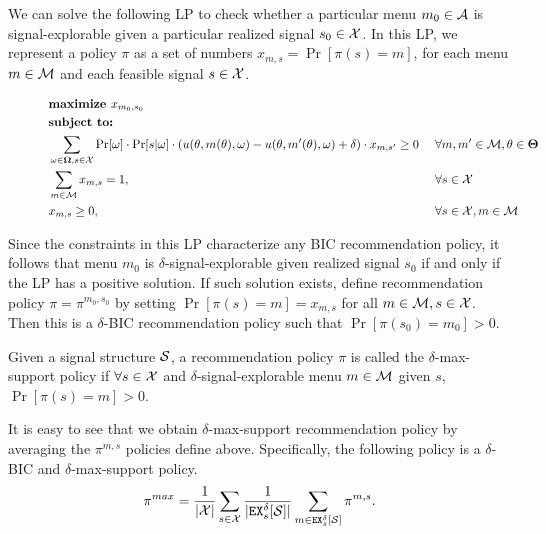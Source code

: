We can solve the following LP to check whether a particular menu $m_0 \in\A$ is signal-explorable given a particular realized signal $s_0\in\X$. In this LP, we represent a policy $\pi$ as a set of numbers
    $x_{m,s} = \Pr[\pi(s)=m]$,
for each menu $m\in \M$ and each feasible signal $s\in \X$. 

\begin{figure}[H]
\begin{mdframed}
\begin{alignat*}{2}
 & \textbf{maximize }    x_{m_0,s_0}\  \\
&  \textbf{subject to: }\\
 & \sum_{\omega \in \varOmega, s \in \X} \Pr[\omega] \cdot \Pr[s | \omega] \cdot \left(u(\theta, m(\theta), \omega) - u(\theta, m'(\theta), \omega) + \delta\right) \cdot x_{m,s'} \geq 0  &\ & \forall m,m' \in \M, \theta \in \varTheta \\
                       & \sum_{m\in \M} x_{m,s} = 1,  \ &\ & \forall s \in \X \\
                       & x_{m,s} \geq 0,  \ &\ & \forall s \in \X, m\in \M \\
\end{alignat*}
\end{mdframed}
\label{fig:nocc_lp}
\end{figure}

Since the constraints in this LP characterize any BIC recommendation policy, it follows that menu $m_0$ is $\delta$-signal-explorable given realized signal $s_0$ if and only if the LP has a positive solution. If such solution exists, define recommendation policy $\pi = \pi^{m_0,s_0}$ by setting $\Pr[\pi(s) = m] = x_{m,s}$ for all $m \in \M, s \in \X$. Then this is a $\delta$-BIC recommendation policy such that $\Pr[\pi(s_0) = m_0] > 0$.

\begin{definition}
Given a signal structure $\S$, a recommendation policy $\pi$ is called the $\delta$-max-support policy if $\forall s \in \X$  and $\delta$-signal-explorable menu $m\in \M$ given $s$, $\Pr[\pi(s) = m] > 0$. 
\end{definition}

It is easy to see that we obtain $\delta$-max-support recommendation policy by averaging the $\pi^{m,s}$ policies define above.  
Specifically, the following policy is a $\delta$-BIC and $\delta$-max-support policy.  
\begin{align}
\label{eq:pimax2}
\pi^{max} = \frac{1}{|\X|} \sum_{s \in \X} \frac{1}{|\EX_s^{\delta}[\S]|} \sum_{m \in \EX_s^{\delta}[\S]} \pi^{m,s}.
\end{align}

